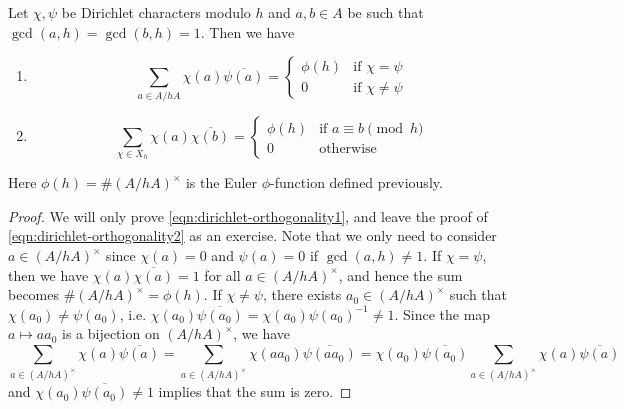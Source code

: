 \begin{theorem}[Orthogonality]
    \label{thm:dirichlet-orthogonality-poly}
    Let $\chi, \psi$ be Dirichlet characters modulo $h$ and $a, b \in A$ be such that $\gcd(a, h) = \gcd(b, h) = 1$.
    Then we have
    \begin{enumerate}
        \item
        \begin{equation}
            \sum_{a \in A / hA} \chi(a) \overline{\psi(a)} = \begin{cases}
                \phi(h) & \text{if } \chi = \psi \\
                0 & \text{if } \chi \ne \psi
            \end{cases}
        \label{eqn:dirichlet-orthogonality1}
        \end{equation}
        \item
        \begin{equation}
            \sum_{\chi \in X_h} \chi(a) \overline{\chi(b)} = \begin{cases}
                \phi(h) & \text{if } a \equiv b \pmod{h} \\
                0 & \text{otherwise}
            \end{cases}
        \label{eqn:dirichlet-orthogonality2}
        \end{equation}
    \end{enumerate}
    Here $\phi(h) = \#(A / hA)^\times$ is the Euler $\phi$-function defined previously.
\end{theorem}
\begin{proof}
    We will only prove \eqref{eqn:dirichlet-orthogonality1}, and leave the proof of \eqref{eqn:dirichlet-orthogonality2} as an exercise.
    Note that we only need to consider $a \in (A / hA)^\times$ since $\chi(a) = 0$ and $\psi(a) = 0$ if $\gcd(a, h) \ne 1$.
    If $\chi = \psi$, then we have $\chi(a)\overline{\chi(a)} = 1$ for all $a \in (A / hA)^\times$, and hence the sum becomes $\#(A / hA)^\times = \phi(h)$.
    If $\chi \ne \psi$, there exists $a_0 \in (A / hA)^\times$ such that $\chi(a_0) \ne \psi(a_0)$, i.e. $\chi(a_0) \overline{\psi(a_0)} = \chi(a_0) \psi(a_0)^{-1} \ne 1$.
    Since the map $a \mapsto a a_0$ is a bijection on $(A / hA)^\times$, we have
    \[
    \sum_{a \in (A / hA)^\times} \chi(a) \overline{\psi(a)} = \sum_{a \in (A / hA)^\times} \chi(a a_0) \overline{\psi(a a_0)} = \chi(a_0)\overline{\psi(a_0)}\sum_{a \in (A / hA)^\times} \chi(a) \overline{\psi(a)}
    \]
    and $\chi(a_0) \overline{\psi(a_0)} \ne 1$ implies that the sum is zero.
\end{proof}

